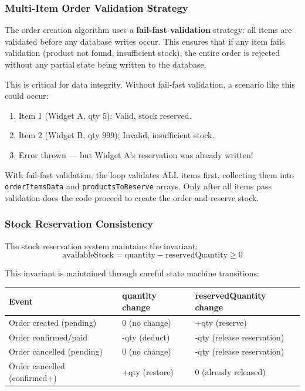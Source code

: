 \documentclass[12pt,onecolumn]{IEEEtran}
\begin{document}
\subsubsection{Multi-Item Order Validation Strategy}

The order creation algorithm uses a \textbf{fail-fast validation} strategy: all items are validated before any database writes occur. This ensures that if any item fails validation (product not found, insufficient stock), the entire order is rejected without any partial state being written to the database.

This is critical for data integrity. Without fail-fast validation, a scenario like this could occur:
\begin{enumerate}[leftmargin=1.5em]
  \item Item 1 (Widget A, qty 5): Valid, stock reserved.
  \item Item 2 (Widget B, qty 999): Invalid, insufficient stock.
  \item Error thrown --- but Widget A's reservation was already written!
\end{enumerate}

With fail-fast validation, the loop validates ALL items first, collecting them into \texttt{orderItemsData} and \texttt{productsToReserve} arrays. Only after all items pass validation does the code proceed to create the order and reserve stock.

\subsubsection{Stock Reservation Consistency}

The stock reservation system maintains the invariant:
\[
\text{availableStock} = \text{quantity} - \text{reservedQuantity} \geq 0
\]

This invariant is maintained through careful state machine transitions:

\begin{center}
\begin{tabularx}{\textwidth}{lXX}
  \toprule
  \textbf{Event} & \textbf{quantity change} & \textbf{reservedQuantity change} \\
  \midrule
  Order created (pending)    & 0 (no change)    & +qty (reserve) \\
  Order confirmed/paid       & -qty (deduct)    & -qty (release reservation) \\
  Order cancelled (pending)  & 0 (no change)    & -qty (release reservation) \\
  Order cancelled (confirmed+) & +qty (restore) & 0 (already released) \\
  \bottomrule
\end{tabularx}
\end{center}
\end{document}
